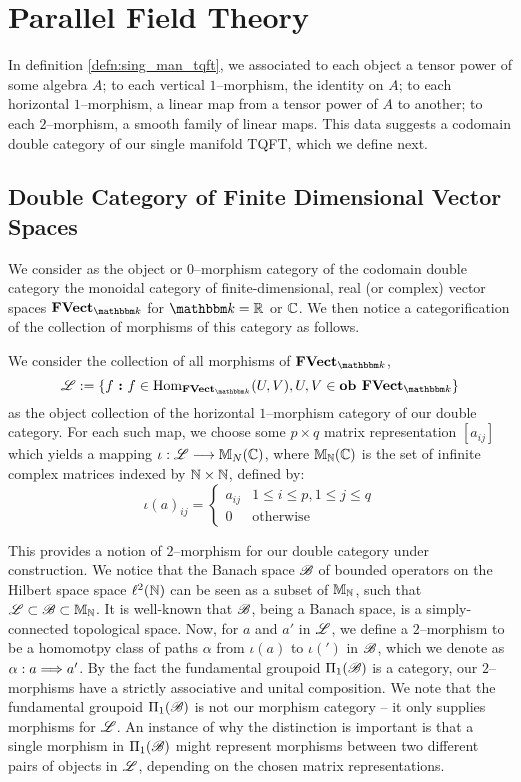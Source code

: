 \documentclass[./Thick_TQFTs_and_Quantum_Information.tex]{subfiles}
\begin{document}
\section{Parallel Field Theory}

In definition \ref{defn:sing_man_tqft}, we associated to each object a tensor
power of some algebra $A$; to each vertical $1$--morphism, the identity on $A$;
to each horizontal $1$--morphism, a linear map from a tensor power of $A$ to
another; to each $2$--morphism, a smooth family of linear maps. This data
suggests a codomain double category of our single manifold TQFT, which we define
next.

\subsection{Double Category of Finite Dimensional Vector Spaces}

We consider as the object or $0$--morphism category of the codomain double
category the monoidal category of finite-dimensional, real (or complex) vector
spaces $\FVect_{\K}$ for $\K = \R$ or $\mathbb{C}$. We then notice a categorification
of the collection of morphisms of this category as follows.

We consider the collection of all morphisms of $\FVect_{\K}$,
\[
  \s{L} := \set[f]{f \in \Hom_{\FVect_{\K}}(U, V), U, V \in \Ob \FVect_{\K}}
\]
as the object collection of the horizontal $1$--morphism category of our double
category. For each such map, we choose some $p \times q$ matrix representation
$[a_{ij}]$ which yields a mapping $\iota : \mathscr{L} \stackrel{}{\longrightarrow} \mathbb{M}_{N}(\mathbb{C})$, where
$\mathbb{M}_{\mathbb{N}}(\mathbb{C})$ is the set of infinite complex matrices indexed by $\mathbb{N} \times \mathbb{N}$,
defined by:
\[
  \iota(a)_{ij} = \begin{cases}
    a_{ij} & 1 \leq i \leq p, 1 \leq j \leq q \\
    0      & \text{otherwise}
  \end{cases}
\]

This provides a notion of $2$--morphism for our double category under
construction. We notice that the Banach space $\mathscr{B}$ of bounded operators on
the Hilbert space space $\ell^2(\mathbb{N})$ can be seen as a subset of $\mathbb{M}_{\mathbb{N}}$, such
that $\mathscr{L} \subset \mathscr{B} \subset \mathbb{M}_{\mathbb{N}}$. It is well-known that $\mathscr{B}$, being
a Banach space, is a simply-connected topological space. Now, for $a$ and $a'$
in $\mathscr{L}$, we define a $2$--morphism to be a homomotpy class of paths $\alpha$
from $\iota(a)$ to $\iota(')$ in $\mathscr{B}$, which we denote as
$\alpha : a \stackrel{}{\Longrightarrow} a'$. By the fact the fundamental groupoid
$\Pi_1(\mathscr{B})$ is a category, our $2$--morphisms have a strictly associative and
unital composition.  We note that the fundamental groupoid $\Pi_1(\mathscr{B})$ is not
our morphism category -- it only supplies morphisms for $\mathscr{L}$. An instance of
why the distinction is important is that a single morphism in $\Pi_1(\mathscr{B})$
might represent morphisms between two different pairs of objects in $\mathscr{L}$,
depending on the chosen matrix representations.
\end{document}
